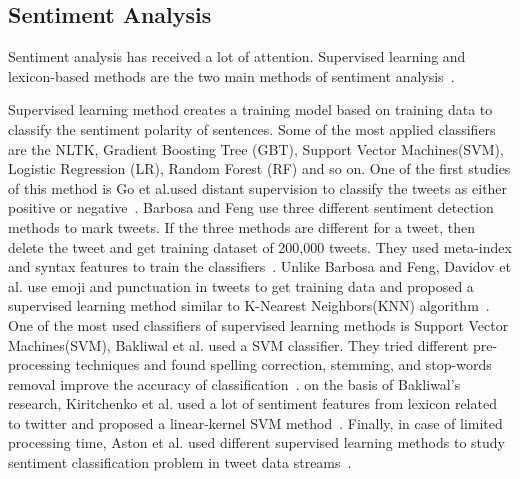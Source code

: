 \documentclass[runningheads]{llncs}
\begin{document}
\subsection{Sentiment Analysis}
Sentiment analysis has received a lot of attention. Supervised learning and lexicon-based methods are the two main methods of sentiment analysis~\cite{Ahmed2017SentiCR}.

Supervised learning method creates a training model based on training data to classify the sentiment polarity of sentences. Some of the most applied classifiers are the NLTK, Gradient Boosting Tree (GBT), Support
Vector Machines(SVM), Logistic Regression (LR), Random Forest (RF) and so on. One of the first studies of this method is Go et al.used distant supervision to classify the tweets as either positive or negative~\cite{Go2009Supervisedlearning}. Barbosa and Feng use three different sentiment detection methods to mark tweets. If the three methods are different for a tweet, then delete the tweet and get training dataset of 200,000 tweets. They used meta-index and syntax features to train the classifiers~\cite{Barbosa2010Supervisedlearning}. Unlike Barbosa and Feng, Davidov et al. use emoji and punctuation in tweets to get training data and proposed a supervised learning method similar to  K-Nearest Neighbors(KNN) algorithm~\cite{Davidov2010Supervisedlearning}. One of the most used classifiers of supervised learning methods is Support Vector Machines(SVM), Bakliwal et al. used a SVM classifier. They tried different pre-processing techniques and found spelling correction, stemming, and stop-words removal improve the accuracy of classification~\cite{Bakliwal2012Supervisedlearning}. on the basis of Bakliwal's research, Kiritchenko et al. used a lot of sentiment features from lexicon related to twitter and proposed a linear-kernel SVM method~\cite{Kiritchenko2014Supervisedlearning}. Finally, in case of limited processing time, Aston et al. used different supervised learning methods to study sentiment classification problem in tweet data streams~\cite{Aston2014Supervisedlearning}.
\end{document}
